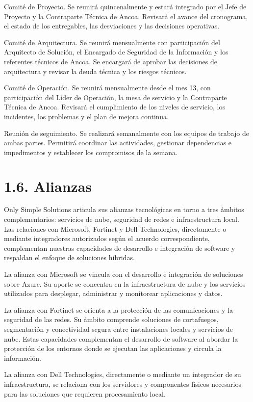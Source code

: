 \documentclass[11pt]{article}
\begin{document}
Comité de Proyecto. Se reunirá quincenalmente y estará integrado por el Jefe de Proyecto y la Contraparte Técnica de Ancoa. Revisará el avance del cronograma, el estado de los entregables, las desviaciones y las decisiones operativas.

Comité de Arquitectura. Se reunirá mensualmente con participación del Arquitecto de Solución, el Encargado de Seguridad de la Información y los referentes técnicos de Ancoa. Se encargará de aprobar las decisiones de arquitectura y revisar la deuda técnica y los riesgos técnicos.

Comité de Operación. Se reunirá mensualmente desde el mes 13, con participación del Líder de Operación, la mesa de servicio y la Contraparte Técnica de Ancoa. Revisará el cumplimiento de los niveles de servicio, los incidentes, los problemas y el plan de mejora continua.

Reunión de seguimiento. Se realizará semanalmente con los equipos de trabajo de ambas partes. Permitirá coordinar las actividades, gestionar dependencias e impedimentos y establecer los compromisos de la semana.

\section{1.6. Alianzas}\label{alianzas}

Only Simple Solutions articula sus alianzas tecnológicas en torno a tres ámbitos complementarios: servicios de nube, seguridad de redes e infraestructura local. Las relaciones con Microsoft, Fortinet y Dell Technologies, directamente o mediante integradores autorizados según el acuerdo correspondiente, complementan nuestras capacidades de desarrollo e integración de software y respaldan el enfoque de soluciones híbridas.

La alianza con Microsoft se vincula con el desarrollo e integración de soluciones sobre Azure. Su aporte se concentra en la infraestructura de nube y los servicios utilizados para desplegar, administrar y monitorear aplicaciones y datos.

La alianza con Fortinet se orienta a la protección de las comunicaciones y la seguridad de las redes. Su ámbito comprende soluciones de cortafuegos, segmentación y conectividad segura entre instalaciones locales y servicios de nube. Estas capacidades complementan el desarrollo de software al abordar la protección de los entornos donde se ejecutan las aplicaciones y circula la información.

La alianza con Dell Technologies, directamente o mediante un integrador de su infraestructura, se relaciona con los servidores y componentes físicos necesarios para las soluciones que requieren procesamiento local.
\end{document}
